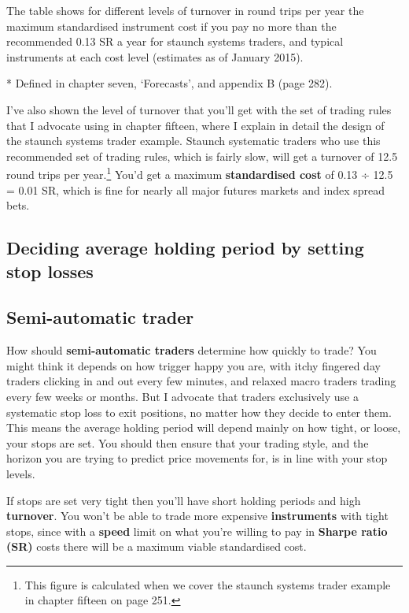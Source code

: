 The table shows for different levels of turnover in round trips per year the maximum standardised instrument cost if you pay no more than the recommended 0.13 SR a year for staunch systems traders, and typical instruments at each cost level (estimates as of January 2015).

* Defined in chapter seven, ‘Forecasts', and appendix B (page 282).

I've also shown the level of turnover that you'll get with the set of trading rules that I advocate using in chapter fifteen, where I explain in detail the design of the staunch systems trader example. Staunch systematic traders who use this recommended set of trading rules, which is fairly slow, will get a turnover of 12.5 round trips per year.\footnote{This figure is calculated when we cover the staunch systems trader example in chapter fifteen on page 251.} You'd get a maximum \textbf{standardised cost} of 0.13 ÷ 12.5 = 0.01 SR, which is fine for nearly all major futures markets and index spread bets.

\subsection*{Deciding average holding period by setting stop losses}

\subsection*{Semi-automatic trader}

How should \textbf{semi-automatic traders} determine how quickly to trade? You might think it depends on how trigger happy you are, with itchy fingered day traders clicking in and out every few minutes, and relaxed macro traders trading every few weeks or months. But I advocate that traders exclusively use a systematic stop loss to exit positions, no matter how they decide to enter them. This means the average holding period will depend mainly on how tight, or loose, your stops are set. You should then ensure that your trading style, and the horizon you are trying to predict price movements for, is in line with your stop levels.

If stops are set very tight then you'll have short holding periods and high \textbf{turnover}. You won't be able to trade more expensive \textbf{instruments} with tight stops, since with a \textbf{speed} limit on what you're willing to pay in \textbf{Sharpe ratio (SR)} costs there will be a maximum viable standardised cost.

